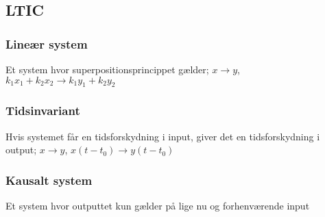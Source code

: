 \subsection{LTIC}
	\subsubsection{Lineær system}
		Et system hvor superpositionsprincippet gælder; $x\rightarrow y$, $k_1x_1+k_2x_2\rightarrow k_1y_1+k_2y_2$

	\subsubsection{Tidsinvariant}
		Hvis systemet får en tidsforskydning i input, giver det en tidsforskydning i output; $x\rightarrow y$, $x(t-t_0)\rightarrow y(t-t_0)$

	\subsubsection{Kausalt system}
		Et system hvor outputtet kun gælder på lige nu og forhenværende input